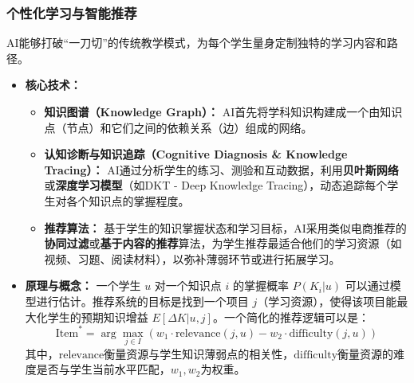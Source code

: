 \begin{itemize}
    \subsubsection{个性化学习与智能推荐}
    AI能够打破“一刀切”的传统教学模式，为每个学生量身定制独特的学习内容和路径。
    \begin{itemize}
        \item \textbf{核心技术：}
            \begin{itemize}
                \item \textbf{知识图谱（Knowledge Graph）：} AI首先将学科知识构建成一个由知识点（节点）和它们之间的依赖关系（边）组成的网络。
                \item \textbf{认知诊断与知识追踪（Cognitive Diagnosis \& Knowledge Tracing）：} AI通过分析学生的练习、测验和互动数据，利用\textbf{贝叶斯网络}或\textbf{深度学习模型}（如DKT - Deep Knowledge Tracing），动态追踪每个学生对各个知识点的掌握程度。
                \item \textbf{推荐算法：} 基于学生的知识掌握状态和学习目标，AI采用类似电商推荐的\textbf{协同过滤}或\textbf{基于内容的推荐}算法，为学生推荐最适合他们的学习资源（如视频、习题、阅读材料），以弥补薄弱环节或进行拓展学习。
            \end{itemize}
        \item \textbf{原理与概念：} 一个学生 $u$ 对一个知识点 $i$ 的掌握概率 $P(K_i | u)$ 可以通过模型进行估计。推荐系统的目标是找到一个项目 $j$（学习资源），使得该项目能最大化学生的预期知识增益 $E[\Delta K | u, j]$。一个简化的推荐逻辑可以是：
        $$
        \text{Item}^* = \arg\max_{j \in I} \left( w_1 \cdot \text{relevance}(j, u) - w_2 \cdot \text{difficulty}(j, u) \right)
        $$
        其中，$\text{relevance}$衡量资源与学生知识薄弱点的相关性，$\text{difficulty}$衡量资源的难度是否与学生当前水平匹配，$w_1, w_2$为权重。
    \end{itemize}


\end{itemize}
